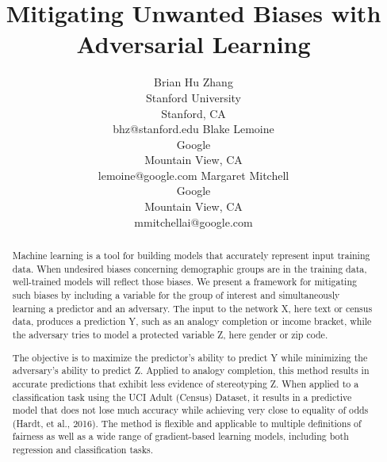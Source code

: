 \documentclass[letterpaper]{article} %
\theoremstyle{definition}
\begin{document}
%
\title{Mitigating Unwanted Biases with Adversarial Learning}
\author{Brian Hu Zhang \\
Stanford University \\
Stanford, CA \\
bhz@stanford.edu
\And
Blake Lemoine \\
Google \\
Mountain View, CA \\
lemoine@google.com
\And
Margaret Mitchell \\
Google \\
Mountain View, CA \\
mmitchellai@google.com
}
\maketitle
\begin{abstract}
Machine learning is a tool for building models that accurately represent input training data. When undesired biases concerning demographic groups are in the training data, well-trained models will reflect those biases. We present a framework for mitigating such biases by including a variable for the group of interest and simultaneously learning a predictor and an adversary. The input to the network X, here text or census data, produces a prediction Y, such as an analogy completion or income bracket, while the adversary tries to model a protected variable Z, here gender or zip code.

The objective is to maximize the predictor’s ability to predict Y while minimizing the adversary's ability to predict Z. Applied to analogy completion, this method results in accurate predictions that exhibit less evidence of stereotyping Z. When applied to a classification task using the UCI Adult (Census) Dataset, it results in a predictive model that does not lose much accuracy while achieving very close to equality of odds (Hardt, et al., 2016). The method is flexible and applicable to multiple definitions of fairness as well as a wide range of gradient-based learning models, including both regression and classification tasks. 
\end{abstract}

\maketitle
\end{document}
